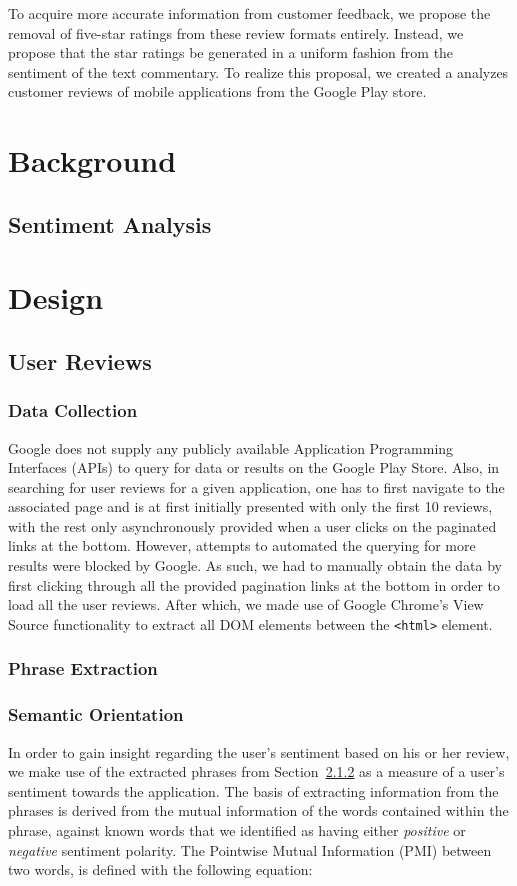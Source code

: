 \documentclass[11pt]{report} %
\begin{document}
To acquire more accurate information from customer feedback, we propose the removal of five-star ratings from these review formats entirely. Instead, we propose that the star ratings be generated in a uniform fashion from the sentiment of the text commentary. To  realize this proposal, we created a analyzes customer reviews of mobile applications from the Google Play store.

\chapter{Background}
	\section{Sentiment Analysis}

\chapter{Design}
\section{User Reviews}
\subsection{Data Collection}
Google does not supply any publicly available Application Programming Interfaces (APIs) to query for data or results on the Google Play Store. Also, in searching for user reviews for a given application, one has to first navigate to the associated page and is at first initially presented with only the first 10 reviews, with the rest only asynchronously provided when a user clicks on the paginated links at the bottom. However, attempts to automated the querying for more results were blocked by Google. As such, we had to manually obtain the data by first clicking through all the provided pagination links at the bottom in order to load all the user reviews. After which, we made use of Google Chrome's View Source functionality to extract all DOM elements between the \verb|<html>| element.
\subsection{Phrase Extraction}
\label{subsection:phrase_extraction}

\subsection{Semantic Orientation}
In order to gain insight regarding the user's sentiment based on his or her review, we make use of the extracted phrases from 
Section~\ref{subsection:phrase_extraction} as a measure of a user's sentiment towards the application. The basis of extracting information from the phrases is derived from the mutual information of the words contained within the phrase, against known words that we identified as having either \textit{positive} or \textit{negative} sentiment polarity. The Pointwise Mutual Information (PMI) between two words\cite{church1990}, is defined with the following equation:
\end{document}

